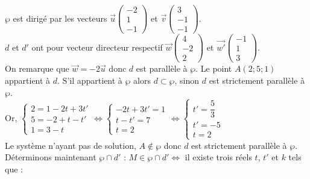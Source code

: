 \documentclass{cornouaille}
\begin{document}
\begin{methode}
$\wp$ est dirigé par les vecteurs $\vec{u} \begin {pmatrix} -2\\1\\-1 \end{pmatrix}$ et $\vec{v} \begin {pmatrix} 3\\-1\\-1 \end{pmatrix}$.\\
$d$ et $d'$ ont pour vecteur directeur respectif $\vec{w} \begin {pmatrix} 4\\-2\\2 \end{pmatrix}$ et $\vec{w'} \begin {pmatrix} -1\\1\\3 \end{pmatrix}$.\\
On remarque que $\overrightarrow{w}=-2\overrightarrow{u}$ donc $d$ est parallèle à $\wp$. Le point $A(2;5;1)$ appartient à $d$.
S'il appartient à $\wp$ alors $d\subset\wp$, sinon $d$ est strictement parallèle à $\wp$.\\
Or,  $\begin{cases} 2=1-2t+3t'\\5=-2+t-t'\\1=3-t \end{cases}\Leftrightarrow\begin{cases} -2t+3t'=1\\t-t'=7\\t=2 \end{cases}\Leftrightarrow\begin{cases} t'=\dfrac{5}{3}\\t'=-5\\t=2 \end{cases}$ \\
Le système n'ayant pas de solution, $A\not\in \wp$ donc $d$ est strictement parallèle à $\wp$.\\
Déterminons maintenant $\wp\cap d'$ :
$M\in\wp\cap d'\Leftrightarrow$ il existe trois réels $t$, $t'$ et $k$ tels que :\\

\end{methode}
\end{document}
